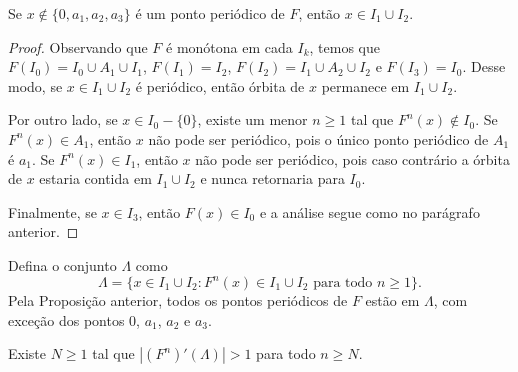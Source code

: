 \begin{proposition}
Se $x \notin \{ 0, a_1, a_2, a_3 \}$ é um ponto periódico de $F$, então $x \in I_1 \cup I_2$.
\end{proposition}


\begin{proof}
Observando que $F$ é monótona em cada $I_k$, temos que $F(I_0) = I_0 \cup A_1 \cup I_1$, $F(I_1) = I_2$, $F(I_2) = I_1 \cup A_2 \cup I_2$ e $F(I_3) = I_0$. Desse modo, se $x \in I_1 \cup I_2$ é periódico, então órbita de $x$ permanece em $I_1 \cup I_2$.

Por outro lado, se $x \in I_0 - \{ 0 \}$, existe um menor $n \geq 1$ tal que $F^n(x) \notin I_0$. Se $F^n(x) \in A_1$, então $x$ não pode ser periódico, pois o único ponto periódico de $A_1$ é $a_1$. Se $F^n(x) \in I_1$, então $x$ não pode ser periódico, pois caso contrário a órbita de $x$ estaria contida em $I_1 \cup I_2$ e nunca retornaria para $I_0$.

Finalmente, se $x \in I_3$, então $F(x) \in I_0$ e a análise segue como no parágrafo anterior.
\end{proof}

Defina o conjunto $\Lambda$ como
$$\Lambda = \{ x \in I_1 \cup I_2 : F^n(x) \in I_1 \cup I_2 \textrm{ para todo } n \geq 1 \}.$$
Pela Proposição anterior, todos os pontos periódicos de $F$ estão em $\Lambda$, com exceção dos pontos $0$, $a_1$, $a_2$ e $a_3$.


\begin{lemma}
Existe $N \geq 1$ tal que $|(F^n)'(\Lambda)| > 1$ para todo $n \geq N$.
\end{lemma}


